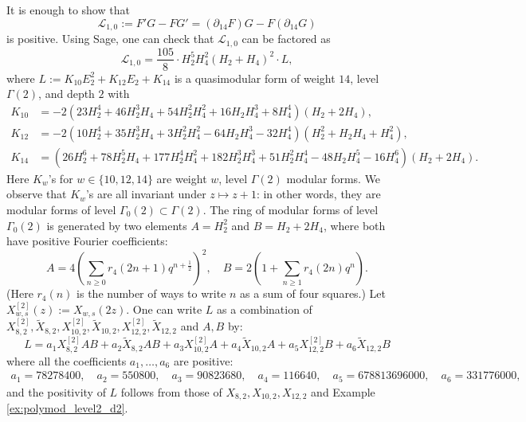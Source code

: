 \documentclass[10pt,reqno]{amsproc}
\newcommand{\cL}{\mathcal{L}}
\newcommand{\1}{\mathds{1}}	%
\theoremstyle{definition}
\theoremstyle{remark}
\begin{document}
It is enough to show that
\[
\cL_{1, 0} := F' G - F G' = (\partial_{14} F) G - F (\partial_{14} G)
\]
is positive.
Using Sage, one can check that $\cL_{1, 0}$ can be factored as
\begin{equation}
\label{eqn:d24ineqfactor}
    \cL_{1, 0} = \frac{105}{8} \cdot H_{2}^{5} H_{4}^{2} (H_{2} + H_{4})^{2} \cdot L,
\end{equation}
where $L := K_{10}E_2^2 + K_{12}E_2 + K_{14}$ is a quasimodular form of weight $14$, level $\Gamma(2)$, and depth $2$ with
\begin{align*}
    K_{10} &= -2 (23 H_2^4 + 46 H_2^3 H_4 + 54 H_2^2 H_4^2 + 16 H_2 H_4^3 + 8 H_4^4) (H_2 + 2H_4), \\
    K_{12} &= -2 (10 H_2^4 + 35 H_2^3 H_4 + 3 H_2^2 H_4^2 -64 H_2 H_4^3 -32 H_4^4)(H_2^2 + H_2 H_4 + H_4^2), \\
    K_{14} &= (26 H_2^6 + 78 H_2^5 H_4 + 177 H_2^4 H_4^2 + 182 H_2^3 H_4^3 + 51 H_2^2 H_4^4 - 48 H_2 H_4^5 - 16 H_4^6)(H_2 + 2H_4).
\end{align*}
Here $K_{w}$'s for $w \in \{10, 12, 14\}$ are weight $w$, level $\Gamma(2)$ modular forms.
We observe that $K_{w}$'s are all invariant under $z \mapsto z + 1$: in other words, they are modular forms of level $\Gamma_0(2) \subset \Gamma(2)$.
The ring of modular forms of level $\Gamma_0(2)$ is generated by two elements $A = H_2^2$ and $B = H_2 + 2H_4$, where both have positive Fourier coefficients:
\[
    A = 4 \left(\sum_{n \geq 0} r_4(2n+1) q^{n + \frac{1}{2}}\right)^{2}, \quad B = 2\left(1 + \sum_{n \geq 1}r_4(2n) q^{n}\right).
\]
(Here $r_4(n)$ is the number of ways to write $n$ as a sum of four squares.)
Let $X_{w, s}^{[2]}(z) := X_{w, s}(2z)$.
One can write $L$ as a combination of $X_{8, 2}^{[2]}, \widetilde{X}_{8, 2}, X_{10, 2}^{[2]}, \widetilde{X}_{10, 2}, X_{12, 2}^{[2]} , \widetilde{X}_{12, 2}$ and $A, B$ by:
\begin{equation}
\label{eqn:d24ineqLcomb}
    L = a_1 X_{8, 2}^{[2]}AB + a_2 \widetilde{X}_{8, 2}AB + a_3 X_{10, 2}^{[2]}A + a_4 \widetilde{X}_{10, 2}A + a_5 X_{12, 2}^{[2]} B + a_6 \widetilde{X}_{12, 2} B
\end{equation}
where all the coefficients $a_1, \dots, a_6$ are positive:
\begin{align*}
    a_1 = 78278400,  \quad
    a_2 = 550800, \quad
    a_3 = 90823680, \quad
    a_4 = 116640, \quad
    a_5 = 678813696000, \quad
    a_6 = 331776000,
\end{align*}
and the positivity of $L$ follows from those of $X_{8, 2}, X_{10, 2}, X_{12, 2}$ \cite[Proposition 4.6]{lee2024algebraic} and Example \ref{ex:polymod_level2_d2}.
\end{document}
